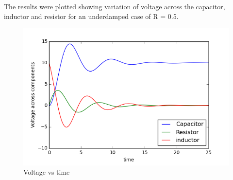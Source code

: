 \documentclass[12pt, a4paper]{report}
\begin{document}
The results were plotted showing variation of voltage across the capacitor, inductor and resistor for an underdamped case of R = 0.5.
\begin{figure}[H]
 \centering
 \includegraphics[width = \textwidth]{../output/V.png}
 \caption{Voltage vs time}
 \label{V}
\end{figure}



\end{document}
